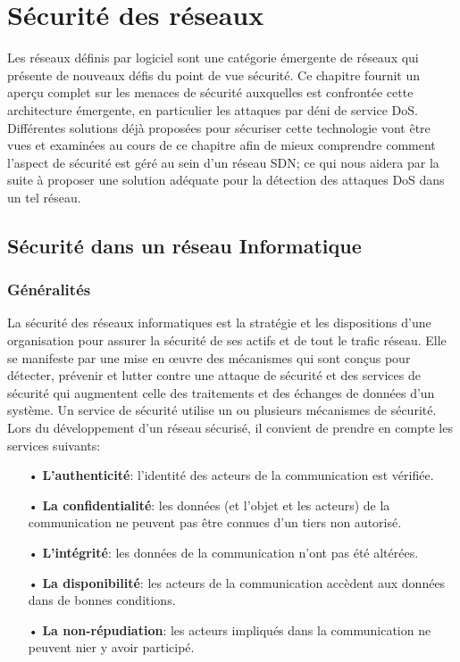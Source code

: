\chapter{Sécurité des réseaux}

\label{Chapter2} 

Les réseaux définis par logiciel sont une catégorie émergente de réseaux qui présente de nouveaux défis du point de vue sécurité. Ce chapitre fournit un aperçu complet sur les menaces de sécurité auxquelles est confrontée cette architecture émergente, en particulier les attaques par déni de service DoS. Différentes solutions déjà proposées pour sécuriser cette technologie vont être vues et examinées au cours de ce chapitre afin de mieux comprendre comment l'aspect de sécurité est géré au sein d'un réseau SDN; ce qui nous aidera par la suite à proposer une solution adéquate pour la détection des attaques DoS dans un tel réseau.

\section{Sécurité dans un réseau Informatique}

\subsection{Généralités}
La sécurité des réseaux informatiques est la stratégie et les dispositions d’une organisation pour assurer la sécurité de ses actifs et de tout le trafic réseau. Elle se manifeste par une mise en œuvre des mécanismes qui sont conçus pour détecter, prévenir et lutter contre une attaque de sécurité et des services de sécurité qui augmentent celle des traitements et des échanges de données d’un système. Un service de sécurité utilise un ou plusieurs mécanismes de sécurité.\\

\noindent Lors du développement d’un réseau sécurisé, il convient de prendre en compte les services suivants:\\
\begin{itemize}
\item[•]\textbf{L’authenticité}: l’identité des acteurs de la communication est vérifiée.\\
\item[•]\textbf{La confidentialité}: les données (et l'objet et les acteurs) de la communication ne peuvent pas être connues d’un tiers non autorisé.\\
\item[•]\textbf{L’intégrité}: les données de la communication n’ont pas été altérées.\\
\item[•]\textbf{La disponibilité}: les acteurs de la communication accèdent aux données dans de bonnes conditions.\\
\item[•]\textbf{La non-répudiation}: les acteurs impliqués dans la communication ne peuvent nier y avoir participé.
\end{itemize}

